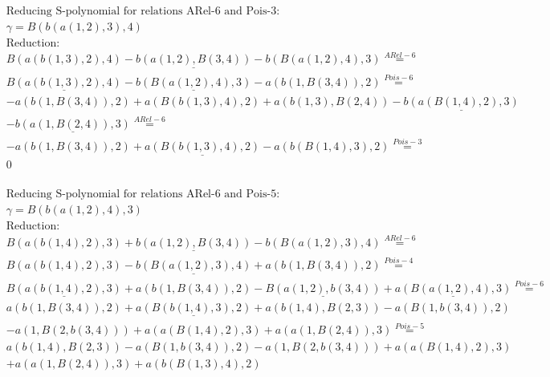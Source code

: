 \documentclass[11pt]{amsart}
\begin{document}
\begin{align*} 
& \text{Reducing S-polynomial for relations ARel-6 and Pois-3:} \\ 
& \gamma = B(b(a(1,2),3),4) \\ 
& \text{Reduction}: \\&B(a(b(1,3),2),4) - \underline{b(a(1,2),B(3,4))} - b(B(a(1,2),4),3) \stackrel{ ARel-6 }{=}  \\ 
&\underline{B(a(b(1,3),2),4)} - \underline{b(B(a(1,2),4),3)} - a(b(1,B(3,4)),2) \stackrel{ Pois-6 }{=}  \\ 
& - a(b(1,B(3,4)),2) + a(B(b(1,3),4),2) + a(b(1,3),B(2,4)) - \underline{b(a(B(1,4),2),3)}\\ 
 &  - \underline{b(a(1,B(2,4)),3)} \stackrel{ ARel-6 }{=}  \\ 
& - a(b(1,B(3,4)),2) + \underline{a(B(b(1,3),4),2)} - a(b(B(1,4),3),2) \stackrel{ Pois-3 }{=}  \\ 
&0\\ 
\end{align*} 
 
\begin{align*} 
& \text{Reducing S-polynomial for relations ARel-6 and Pois-5:} \\ 
& \gamma = B(b(a(1,2),4),3) \\ 
& \text{Reduction}: \\&B(a(b(1,4),2),3) + \underline{b(a(1,2),B(3,4))} - b(B(a(1,2),3),4) \stackrel{ ARel-6 }{=}  \\ 
&B(a(b(1,4),2),3) - \underline{b(B(a(1,2),3),4)} + a(b(1,B(3,4)),2) \stackrel{ Pois-4 }{=}  \\ 
&\underline{B(a(b(1,4),2),3)} + a(b(1,B(3,4)),2) - \underline{B(a(1,2),b(3,4))} + \underline{a(B(a(1,2),4),3)} \stackrel{ Pois-6 }{=}  \\ 
&a(b(1,B(3,4)),2) + \underline{a(B(b(1,4),3),2)} + a(b(1,4),B(2,3)) - a(B(1,b(3,4)),2)\\ 
 &  - a(1,B(2,b(3,4))) + a(a(B(1,4),2),3) + a(a(1,B(2,4)),3) \stackrel{ Pois-5 }{=}  \\ 
&a(b(1,4),B(2,3)) - a(B(1,b(3,4)),2) - a(1,B(2,b(3,4))) + a(a(B(1,4),2),3)\\ 
 &  + a(a(1,B(2,4)),3) + a(b(B(1,3),4),2)\\ 
\end{align*} 
 
\end{document}
